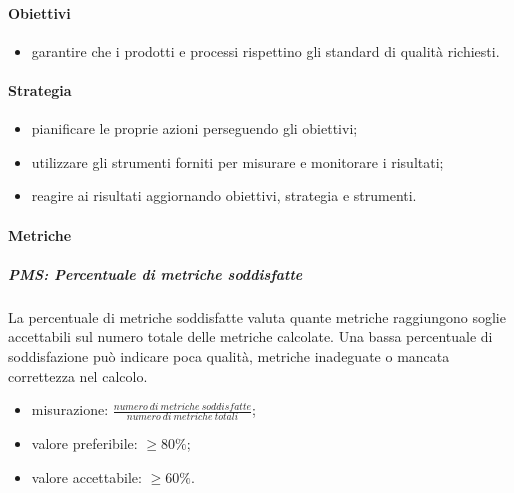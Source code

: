 		\paragraph{Obiettivi}
			\begin{itemize}
				\item garantire che i prodotti e processi rispettino gli standard di qualità richiesti.
			\end{itemize}
		\paragraph{Strategia}
		\begin{itemize}
			\item pianificare le proprie azioni perseguendo gli obiettivi;
			\item utilizzare gli strumenti forniti per misurare e monitorare i risultati;
			\item reagire ai risultati aggiornando obiettivi, strategia e strumenti.
		\end{itemize}
		\paragraph{Metriche}
			\subparagraph{PMS: Percentuale di metriche soddisfatte}
			La percentuale di metriche soddisfatte valuta quante metriche raggiungono soglie accettabili sul numero totale delle metriche calcolate. Una bassa percentuale di soddisfazione può indicare poca qualità, metriche inadeguate o mancata correttezza nel calcolo.
			\begin{itemize}
				\item misurazione: $\frac{numero\ di\ metriche\ soddisfatte}{numero\ di\ metriche\ totali} $;
				\item valore preferibile: $ \geq 80\%$;
				\item valore accettabile: $ \geq 60\%$.
			\end{itemize}
		